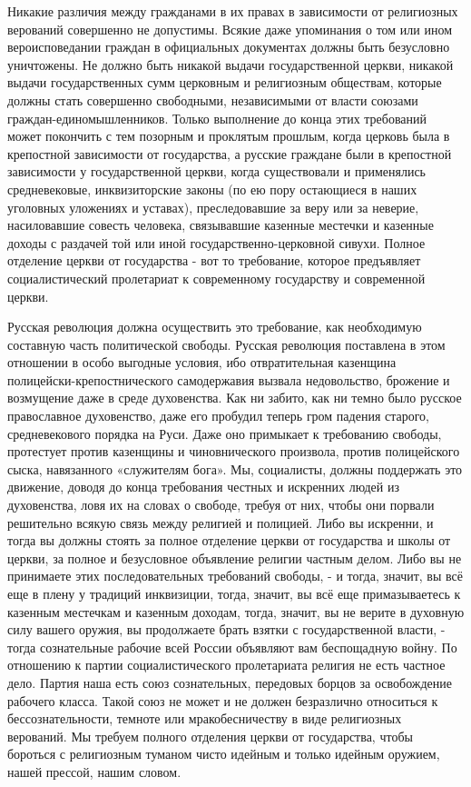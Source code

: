 \documentclass[12pt]{article}
\newcommand{\parnum}{(\arabic{parcount})}
\newcounter{parcount}
\newenvironment{parnumbers}{%
  \par%
  \everypar{\noindent \stepcounter{parcount}\marginpar[]{\parnum}}%
}{}
\begin{document}
\begin{parnumbers}
Никакие различия между гражданами в их правах в зависимости от религиозных верований совершенно не допустимы. Всякие даже упоминания о том или ином вероисповедании граждан в официальных документах должны быть безусловно уничтожены. Не должно быть никакой выдачи государственной церкви, никакой выдачи государственных сумм церковным и религиозным обществам, которые должны стать совершенно свободными, независимыми от власти союзами граждан-единомышленников. Только выполнение до конца этих требований может покончить с тем позорным и проклятым прошлым, когда церковь была в крепостной зависимости от государства, а русские граждане были в крепостной зависимости у государственной церкви, когда существовали и применялись средневековые, инквизиторские законы (по ею пору остающиеся в наших уголовных уложениях и уставах), преследовавшие за веру или за неверие, насиловавшие совесть человека, связывавшие казенные местечки и казенные доходы с раздачей той или иной государственно-церковной сивухи. Полное отделение церкви от государства - вот то требование, которое предъявляет социалистический пролетариат к современному государству и современной церкви.

Русская революция должна осуществить это требование, как необходимую составную часть политической свободы. Русская революция поставлена в этом отношении в особо выгодные условия, ибо отвратительная казенщина полицейски-крепостнического самодержавия вызвала недовольство, брожение и возмущение даже в среде духовенства. Как ни забито, как ни темно было русское православное духовенство, даже его пробудил теперь гром падения старого, средневекового порядка на Руси. Даже оно примыкает к требованию свободы, протестует против казенщины и чиновнического произвола, против полицейского сыска, навязанного «служителям бога». Мы, социалисты, должны поддержать это движение, доводя до конца требования честных и искренних людей из духовенства, ловя их на словах о свободе, требуя от них, чтобы они порвали решительно всякую связь между религией и полицией. Либо вы искренни, и тогда вы должны стоять за полное отделение церкви от государства и школы от церкви, за полное и безусловное объявление религии частным делом. Либо вы не принимаете этих последовательных требований свободы, - и тогда, значит, вы всё еще в плену у традиций инквизиции, тогда, значит, вы всё еще примазываетесь к казенным местечкам и казенным доходам, тогда, значит, вы не верите в духовную силу вашего оружия, вы продолжаете брать взятки с государственной власти, - тогда сознательные рабочие всей России объявляют вам беспощадную войну. По отношению к партии социалистического пролетариата религия не есть частное дело. Партия наша есть союз сознательных, передовых борцов за освобождение рабочего класса. Такой союз не может и не должен безразлично относиться к бессознательности, темноте или мракобесничеству в виде религиозных верований. Мы требуем полного отделения церкви от государства, чтобы бороться с религиозным туманом чисто идейным и только идейным оружием, нашей прессой, нашим словом.


\end{parnumbers}
\end{document}
